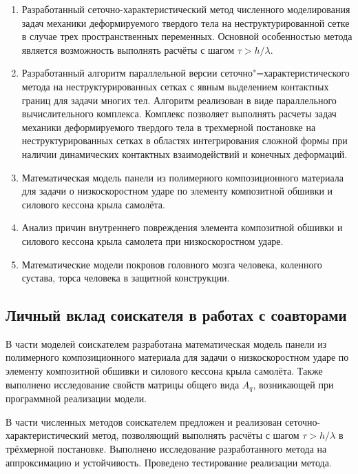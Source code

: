 \begin{enumerate}

\item Разработанный сеточно-характеристический метод численного моделирования задач механики деформируемого твердого тела на неструктурированной сетке в случае трех пространственных переменных. Основной особенностью метода является возможность выполнять расчёты с шагом $\tau > h / \lambda$.

\item Разработанный алгоритм параллельной версии сеточно"=характеристического метода на неструктурированных сетках с явным выделением контактных границ для задачи многих тел. Алгоритм реализован в виде параллельного вычислительного комплекса. Комплекс позволяет выполнять расчеты задач механики деформируемого твердого тела в трехмерной постановке на неструктурированных сетках в областях интегрирования сложной формы при наличии динамических контактных взаимодействий и конечных деформаций.

\item Математическая модель панели из полимерного композиционного материала для задачи о низкоскоростном ударе по элементу композитной обшивки и силового кессона крыла самолёта.

\item Анализ причин внутреннего повреждения элемента композитной обшивки и силового кессона крыла самолета при низкоскоростном ударе.

\item Математические модели покровов головного мозга человека, коленного сустава, торса человека в защитной конструкции.

\end{enumerate}


\subsection*{Личный вклад соискателя в работах с соавторами}

В части моделей соискателем разработана математическая модель панели из полимерного композиционного материала для задачи о низкоскоростном ударе по элементу композитной обшивки и силового кессона крыла самолёта. Также выполнено исследование свойств матрицы общего вида $A_q$, возникающей при программной реализации модели.

В части численных методов соискателем предложен и реализован сеточно-характеристический метод, позволяющий выполнять расчёты с шагом $\tau > h / \lambda$ в трёхмерной постановке. Выполнено исследование разработанного метода на аппроксимацию и устойчивость. Проведено тестирование реализации метода.


